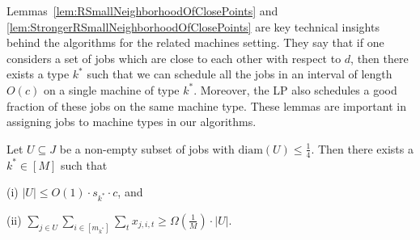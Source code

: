   
  Lemmas~\ref{lem:RSmallNeighborhoodOfClosePoints} and \ref{lem:StrongerRSmallNeighborhoodOfClosePoints} are key technical insights  behind the algorithms for the related machines setting. They say that if one considers a set of jobs which are close to each other with respect to $d$,  then there exists a type $k^*$ such that we can schedule all the jobs in an interval of length $O(c)$ on a single machine of type $k^*$. Moreover, the LP also schedules a good fraction  of these jobs on the same machine type.
  These lemmas are important in assigning jobs to machine types in our algorithms.
  
  
  
  \begin{lemma}
  \label{lem:RSmallNeighborhoodOfClosePoints}
  Let $U \subseteq J$ be a non-empty subset of jobs with $\textrm{diam}(U) \leq \frac{1}{4}$. Then there exists a $k^* \in [M]$ such that
  \begin{enumerate*}
  \item[(i)] $|U| \leq O(1) \cdot s_{k^*} \cdot c$, and
  \item[(ii)] $\sum_{j \in U} \sum_{i \in [m_{k^*}]} \sum_t x_{j,i,t} \geq \Omega(\frac{1}{M}) \cdot |U|$.
  \end{enumerate*}
  \end{lemma}
  
